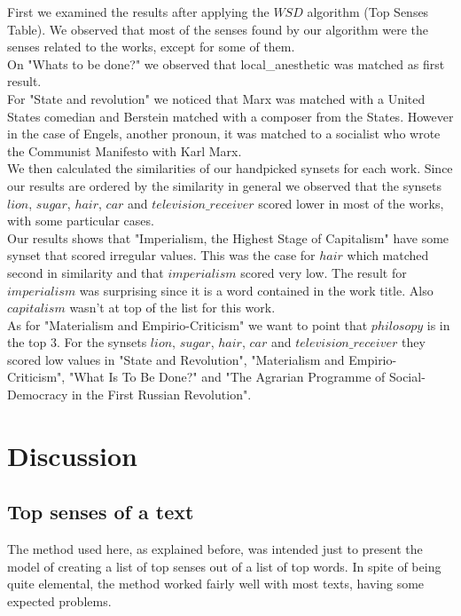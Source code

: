 \documentclass{pnastwo}
\begin{document}
\begin{article}


First we examined the results after applying the $WSD$ algorithm (Top Senses Table). We observed that most of the senses found by our algorithm were the senses related to the works, except for some of them.\\

On "Whats to be done?" we observed that local\_anesthetic was matched as first result. \\
For "State and revolution" we noticed that Marx was matched with a United States comedian and Berstein matched with a composer from the States. However in the case of Engels, another pronoun, it was matched to a socialist who wrote the Communist Manifesto with Karl Marx. \\

We then calculated the similarities of our handpicked synsets for each work. Since our results are ordered by the similarity in general we observed that the synsets $lion$, $sugar$, $hair$, $car$ and $television\_receiver$ scored lower in most of the works, with some particular cases. \\

Our results shows that "Imperialism, the Highest Stage of Capitalism" have some synset that scored irregular values. This was the case for $hair$ which matched second in similarity and that $imperialism$ scored very low. The result for $imperialism$ was surprising since it is a word contained in the work title. Also $capitalism$ wasn't at top of the list for this work.\\

As for "Materialism and Empirio-Criticism" we want to point that $philosopy$ is in the top $3$.
For the synsets $lion$, $sugar$, $hair$, $car$ and $television\_receiver$ they scored low values in  "State and Revolution", "Materialism and Empirio-Criticism", "What Is To Be Done?" and "The Agrarian Programme of Social-Democracy in the First Russian Revolution".



\section{Discussion}


\subsection{Top senses of a text}
The method used here, as explained before, was intended just to present the model of creating a list of top senses out of a list of top words. In spite of being quite elemental, the method worked fairly well with most texts, having some expected problems.


\end{article}
\end{document}
